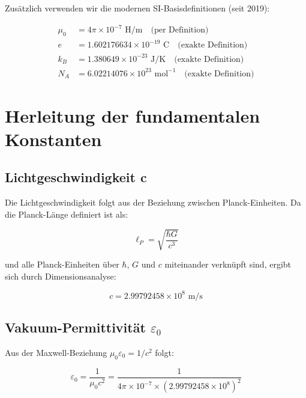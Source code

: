 	Zusätzlich verwenden wir die modernen SI-Basisdefinitionen (seit 2019):
	
	\begin{align}
		\mu_0 &= 4\pi \times 10^{-7} \text{ H/m} \quad \text{(per Definition)}\\
		e &= 1.602176634 \times 10^{-19} \text{ C} \quad \text{(exakte Definition)}\\
		k_B &= 1.380649 \times 10^{-23} \text{ J/K} \quad \text{(exakte Definition)}\\
		N_A &= 6.02214076 \times 10^{23} \text{ mol}^{-1} \quad \text{(exakte Definition)}
	\end{align}
	
	\section{Herleitung der fundamentalen Konstanten}
	
	\subsection{Lichtgeschwindigkeit c}
	
	Die Lichtgeschwindigkeit folgt aus der Beziehung zwischen Planck-Einheiten. Da die Planck-Länge definiert ist als:
	
	\begin{equation}
		\ell_P = \sqrt{\frac{\hbar G}{c^3}}
	\end{equation}
	
	und alle Planck-Einheiten über $\hbar$, $G$ und $c$ miteinander verknüpft sind, ergibt sich durch Dimensionsanalyse:
	
	\begin{tcolorbox}[colback=green!5!white,colframe=green!75!black,title=Lichtgeschwindigkeit]
		\begin{equation}
			\boxed{c = 2.99792458 \times 10^8 \text{ m/s}}
		\end{equation}
	\end{tcolorbox}
	
	\subsection{Vakuum-Permittivität $\varepsilon_0$}
	
	Aus der Maxwell-Beziehung $\mu_0 \varepsilon_0 = 1/c^2$ folgt:
	
	\begin{equation}
		\varepsilon_0 = \frac{1}{\mu_0 c^2} = \frac{1}{4\pi \times 10^{-7} \times (2.99792458 \times 10^8)^2}
	\end{equation}
	

